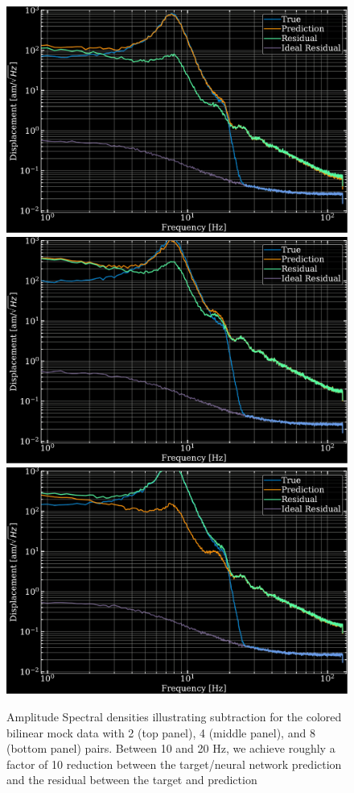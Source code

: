 \begin{refsection}
\begin{figure}[htbp]
   \centering
   \includegraphics[width=.7\columnwidth]{chapter_noise_sub/etc/spectra8C}
    \includegraphics[width=.7\columnwidth]{chapter_noise_sub/etc/spectra16C}
     \includegraphics[width=.7\columnwidth]{chapter_noise_sub/etc/spectra32C}
   \caption{Amplitude Spectral densities illustrating subtraction for the colored bilinear mock data with 2 (top panel), 4 (middle panel), and 8 (bottom panel) pairs. Between 10 and 20 Hz, we achieve roughly a factor of 10 reduction between the target/neural network prediction and the residual between the target and prediction}
   \label{fig:ASD2}
\end{figure}


\end{refsection}

